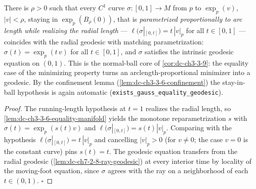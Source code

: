 \begin{lemma}
  \label{lem:dc-ch3-3-6-equality-geodesic}
  \leanok
  There is $\rho>0$ such that every $C^1$ curve $\sigma:[0,1]\to M$ from $p$
  to $\exp_p(v)$, $|v|<\rho$, staying in $\exp_p(B_\rho(0))$, that is
  \emph{parametrized proportionally to arc length while realizing the radial
  length} — $\ell(\sigma|_{[0,t]})=t\,|v|_p$ for all $t\in[0,1]$ — coincides
  with the radial geodesic with matching parametrization:
  $\sigma(t)=\exp_p(t\,v)$ for all $t\in[0,1]$, and $\sigma$ satisfies the
  intrinsic geodesic equation on $(0,1)$. This is the normal-ball core of
  \cref{cor:dc-ch3-3-9}: the equality case of the minimizing property turns
  an arclength-proportional minimizer into a geodesic. By the confinement
  lemma (\cref{lem:dc-ch3-3-6-confinement}) the stay-in-ball hypothesis is
  again automatic (\texttt{exists\_gauss\_equality\_geodesic}).
\end{lemma}
\begin{proof}
  \leanok
  The running-length hypothesis at $t=1$ realizes the radial length, so
  \cref{lem:dc-ch3-3-6-equality-manifold} yields the monotone
  reparametrization $s$ with $\sigma(t)=\exp_p(s(t)v)$ and
  $\ell(\sigma|_{[0,t]})=s(t)|v|_p$. Comparing with the hypothesis
  $\ell(\sigma|_{[0,t]})=t\,|v|_p$ and cancelling $|v|_p>0$ (for $v\ne0$;
  the case $v=0$ is the constant curve) pins $s(t)=t$. The geodesic equation
  transfers from the radial geodesic (\cref{lem:dc-ch7-2-8-ray-geodesic}) at
  every interior time by locality of the moving-foot equation, since
  $\sigma$ agrees with the ray on a neighborhood of each $t\in(0,1)$.
  $\square$
\end{proof}

